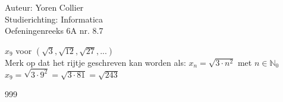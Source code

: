 \documentclass[a4paper]{article}
\newcommand{\Lh}{\left(} %
\newcommand{\Rh}{\right)}
\begin{document}
\noindent \large Auteur: Yoren Collier \\
\noindent \large Studierichting: Informatica\\
\noindent \large Oefeningenreeks 6A nr. 8.7\\

\medskip

\normalsize

$x_{9}$ voor $\Lh \sqrt{3}, \sqrt{12}, \sqrt{27}, ... \Rh$\\

Merk op dat het rijtje geschreven kan worden als: $x_n =\sqrt{3 \cdot n^2}$ met $n \in \mathbb{N}_0$\\

$x_{9} = \sqrt{3 \cdot9^2} = \sqrt{3 \cdot 81} = \sqrt{243}$\\

\begin{thebibliography}{999}
\end{thebibliography}
\end{document}
